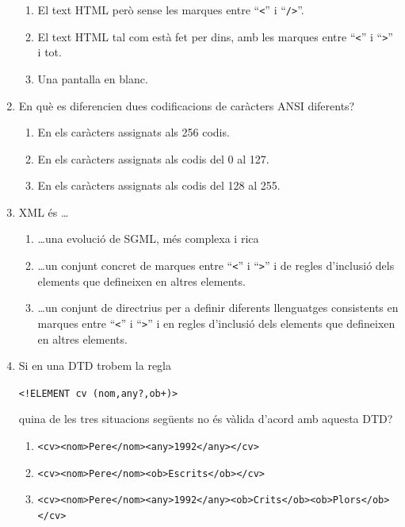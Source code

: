 \begin{enumerate}
\begin{enumerate}
\item El text HTML però sense les marques entre ``\verb|<|'' i
     ``\verb|/>|''.
\item El text HTML tal com està fet per dins, amb les marques
     entre ``\verb|<|'' i
     ``\verb|>|'' i tot.
\item Una pantalla en blanc.
\end{enumerate}
\item 
   En què es diferencien dues codificacions de caràcters ANSI diferents?
   
\begin{enumerate}
\item En els caràcters assignats als 256 codis.
\item En els caràcters assignats als codis del 0 al 127.
\item En els caràcters assignats als codis del 128 al 255.
\end{enumerate}

\item 
   XML és {\ldots}
   
\begin{enumerate}
\item {\ldots}una evolució de SGML, més complexa i rica
\item {\ldots}un conjunt concret de marques entre ``\verb|<|'' i
     ``\verb|>|'' i de regles d'inclusió dels elements que
     defineixen en altres elements.
\item {\ldots}un conjunt de directrius per a definir diferents
     llenguatges consistents en marques entre ``\verb|<|'' i
     ``\verb|>|'' i en regles d'inclusió dels elements que
     defineixen en altres elements.
\end{enumerate}
\item 
   Si en una DTD trobem la regla
   \begin{center}\verb|<!ELEMENT cv (nom,any?,ob+)>|\end{center}
   quina de les tres situacions següents no és vàlida d'acord amb
   aquesta DTD?
   
\begin{enumerate}
\item 
      \verb|<cv><nom>Pere</nom><any>1992</any></cv>|
      
\item 
      \verb|<cv><nom>Pere</nom><ob>Escrits</ob></cv>|
      
\item 
      \verb|<cv><nom>Pere</nom><any>1992</any><ob>Crits</ob><ob>Plors</ob></cv>|
      

\end{enumerate}
\end{enumerate}
